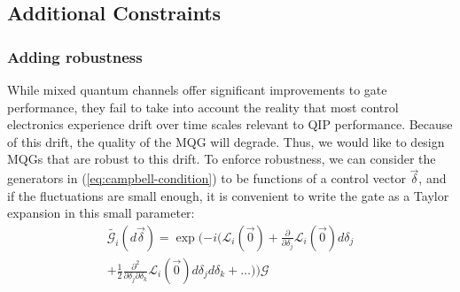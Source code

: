 \documentclass[aps,nofootinbib,pra,notitlepage,twocolumn]{revtex4-1}
\begin{document}
\subsection{Additional Constraints}
\subsubsection{Adding robustness} %
\label{sub:adding_robustness}
While mixed quantum channels offer significant improvements to gate performance, they fail to take into account the reality that most control electronics experience drift over time scales relevant to QIP performance. Because of this drift, the quality of the MQG will degrade. Thus, we would like to design MQGs that are robust to this drift. To enforce robustness, we can consider the generators in (\ref{eq:campbell-condition}) to be functions of a control vector $\vec{\delta}$, and if the fluctuations are small enough, it is convenient to write the gate as a Taylor expansion in this small parameter:
\begin{equation}\label{eq:taylor}
\begin{gathered}
\tilde{\mathcal{G}_i}(d\vec{\delta}) = \exp(-i(\mathcal{L}_i(\vec{0}) + \frac{\partial}{\partial\delta_j}\mathcal{L}_i(\vec{0})d\delta_j\\ +  \frac{1}{2}\frac{\partial^2}{\partial\delta_j\partial\delta_k} \mathcal{L}_i(\vec{0})d\delta_j d\delta_k + \ldots))\mathcal{G}
\end{gathered}
\end{equation}
\end{document}
